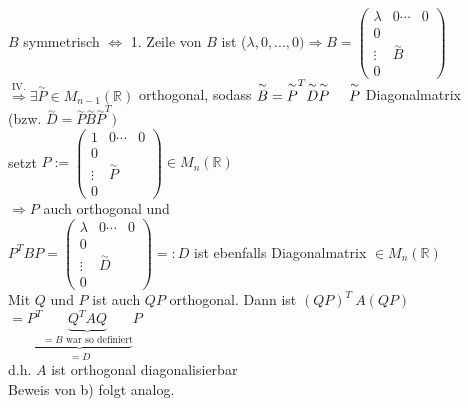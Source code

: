 \documentclass[a4paper,11pt]{article}
\newcommand{\hsp}{\hspace{5mm}}
\begin{document}
$B$ symmetrisch $\Leftrightarrow$ 1. Zeile von $B$ ist ($\lambda,0,...,0)\Rightarrow B=\begin{pmatrix}\lambda&0\cdots&0\\0\\\vdots&\overset{\sim}{B}&\\0\end{pmatrix}$ \\
$\overset{\text{IV.}}{\Rightarrow}\exists\overset{\sim}{P}\in M_{n-1}(\mathbb{R})$ orthogonal, sodass $\overset{\sim}{B}=\overset{\sim}{P}^T\overset{\sim}{D}\overset{\sim}{P}\hsp\overset{\sim}{P}$ Diagonalmatrix \\
(bzw. $\overset{\sim}{D}=\overset{\sim}{P}\overset{\sim}{B}\overset{\sim}{P}^T)$ \\
setzt $P:=\begin{pmatrix}1&0\cdots&0\\0\\\vdots&\overset{\sim}{P}&\\0\end{pmatrix}\in M_n(\mathbb{R})$ \\
$\Rightarrow P$ auch orthogonal und \\
$P^TBP=\begin{pmatrix}\lambda&0\cdots&0\\0\\\vdots&\overset{\sim}{D}&\\0\end{pmatrix}=:D$ ist ebenfalls Diagonalmatrix $\in M_n(\mathbb{R})$ \\
Mit $Q$ und $P$ ist auch $QP$ orthogonal. Dann ist $(QP)^T\:A(QP)$ \\
$=\underbrace{P^T\underbrace{Q^TAQ}_{=B\text{ war so definiert}}}_{=D}P$  \\
d.h. $A$ ist orthogonal diagonalisierbar \\
Beweis von b) folgt analog.
\end{document}
